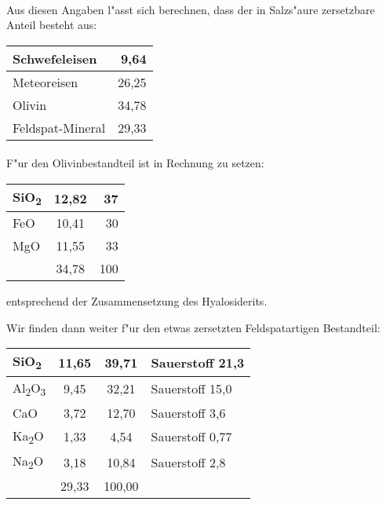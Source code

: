 \documentclass[a4paper, 11pt, oneside]{article}
\begin{document}
\paragraph{}
Aus diesen Angaben l"asst sich berechnen, dass der in Salzs"aure zersetzbare Anteil besteht aus:
\begin{center}
    \begin{tabular}{ |l|r| } 
    \hline
    Schwefeleisen & 9,64\\\hline
    Meteoreisen & 26,25\\\hline
    Olivin & 34,78\\\hline
    Feldspat-Mineral & 29,33\\
    \hline
    \end{tabular}
\end{center}
\paragraph{}
F"ur den Olivinbestandteil ist in Rechnung zu setzen:
\begin{center}
    \begin{tabular}{ |l|c|r| } 
    \hline
    SiO\textsubscript{2} & 12,82 & 37\\\hline
    FeO & 10,41 & 30\\\hline
    MgO & 11,55 & 33\\\hline
    & 34,78 & 100\\
    \hline
    \end{tabular}
\end{center}
entsprechend der Zusammensetzung des Hyalosiderits.

Wir finden dann weiter f"ur den etwas zersetzten Feldspatartigen Bestandteil:
\begin{center}
    \begin{tabular}{ |l|c|c|l| } 
    \hline
    SiO\textsubscript{2} & 11,65 & 39,71 & Sauerstoff 21,3\\\hline
    Al\textsubscript{2}O\textsubscript{3} & 9,45 & 32,21 & Sauerstoff 15,0\\\hline
    CaO & 3,72 & 12,70 & Sauerstoff 3,6\\\hline
    Ka\textsubscript{2}O & 1,33 & 4,54 & Sauerstoff 0,77\\\hline
    Na\textsubscript{2}O & 3,18 & 10,84 & Sauerstoff 2,8\\\hline
    & 29,33 & 100,00\\
    \hline
    \end{tabular}
\end{center}
\end{document}
